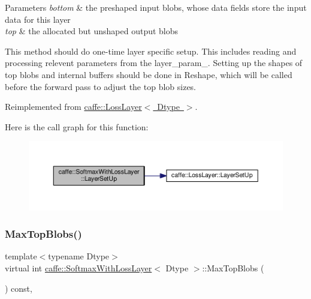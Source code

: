 \begin{DoxyParams}{Parameters}
{\em bottom} & the preshaped input blobs, whose data fields store the input data for this layer \\
\hline
{\em top} & the allocated but unshaped output blobs\\
\hline
\end{DoxyParams}
This method should do one-\/time layer specific setup. This includes reading and processing relevent parameters from the {\ttfamily layer\+\_\+param\+\_\+}. Setting up the shapes of top blobs and internal buffers should be done in {\ttfamily Reshape}, which will be called before the forward pass to adjust the top blob sizes. 

Reimplemented from \mbox{\hyperlink{classcaffe_1_1_loss_layer_aa6fc7c2e90be66f1c1f0683637c949da}{caffe\+::\+Loss\+Layer$<$ Dtype $>$}}.

Here is the call graph for this function\+:
\nopagebreak
\begin{figure}[H]
\begin{center}
\leavevmode
\includegraphics[width=350pt]{classcaffe_1_1_softmax_with_loss_layer_a96cd04896d4b805fcaf36c2c6522ae10_cgraph}
\end{center}
\end{figure}
\mbox{\label{classcaffe_1_1_softmax_with_loss_layer_a5a0b4c02fe76ae9087cd8b1b9edd9910}} 
\subsubsection{\texorpdfstring{Max\+Top\+Blobs()}{MaxTopBlobs()}\hspace{0.1cm}{\footnotesize\ttfamily [1/2]}}
{\footnotesize\ttfamily template$<$typename Dtype$>$ \\
virtual int \mbox{\hyperlink{classcaffe_1_1_softmax_with_loss_layer}{caffe\+::\+Softmax\+With\+Loss\+Layer}}$<$ Dtype $>$\+::Max\+Top\+Blobs (\begin{DoxyParamCaption}{ }\end{DoxyParamCaption}) const\hspace{0.3cm}{\ttfamily [inline]}, {\ttfamily [virtual]}}



